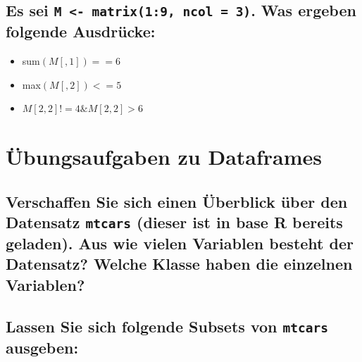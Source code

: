 \documentclass[12pt,a4paper]{article}
\begin{document}
\hypertarget{es-sei-.-was-ergeben-folgende-ausdruxfccke}{%
\subsection{\texorpdfstring{Es sei \texttt{M <- matrix(1:9, ncol = 3)}.
Was ergeben folgende
Ausdrücke:}{Es sei . Was ergeben folgende Ausdrücke:}}\label{es-sei-.-was-ergeben-folgende-ausdruxfccke}}

\begin{itemize}
  \item sum$(M[ , 1]) == 6$
  \item max$(M[ , 2]) <= 5$
  \item $M[2, 2] != 4 \& M[2, 2] > 6$
\end{itemize}

\hypertarget{uxfcbungsaufgaben-zu-dataframes}{%
\section{Übungsaufgaben zu
Dataframes}\label{uxfcbungsaufgaben-zu-dataframes}}

\hypertarget{verschaffen-sie-sich-einen-uxfcberblick-uxfcber-den-datensatz-dieser-ist-in-base-r-bereits-geladen.-aus-wie-vielen-variablen-besteht-der-datensatz-welche-klasse-haben-die-einzelnen-variablen}{%
\subsection{\texorpdfstring{Verschaffen Sie sich einen Überblick über
den Datensatz \texttt{mtcars} (dieser ist in base R bereits geladen).
Aus wie vielen Variablen besteht der Datensatz? Welche Klasse haben die
einzelnen
Variablen?}{Verschaffen Sie sich einen Überblick über den Datensatz  (dieser ist in base R bereits geladen). Aus wie vielen Variablen besteht der Datensatz? Welche Klasse haben die einzelnen Variablen?}}\label{verschaffen-sie-sich-einen-uxfcberblick-uxfcber-den-datensatz-dieser-ist-in-base-r-bereits-geladen.-aus-wie-vielen-variablen-besteht-der-datensatz-welche-klasse-haben-die-einzelnen-variablen}}

\hypertarget{lassen-sie-sich-folgende-subsets-von-ausgeben}{%
\subsection{\texorpdfstring{Lassen Sie sich folgende Subsets von
\texttt{mtcars}
ausgeben:}{Lassen Sie sich folgende Subsets von  ausgeben:}}\label{lassen-sie-sich-folgende-subsets-von-ausgeben}}
\end{document}
